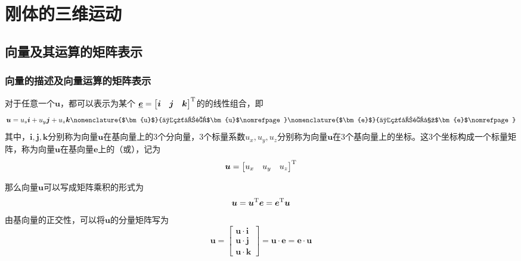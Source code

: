 \chapter{刚体的三维运动}
\thispagestyle{empty}
\section{向量及其运算的矩阵表示}
\label{向量运算的矩阵表示}

\subsection{向量的描述及向量运算的矩阵表示}
对于任意一个$\bm{u}$，都可以表示为某个
$\underline{\bm{e}} = \big[ \bm{i} \quad \bm{j} \quad \bm{k} \big]^{\text{T}} $的的线性组合，即
\begin{equation}
	\bm{u} = u_s \bm{i} + u_y \bm{j} + u_z \bm{k}
	\nomenclature{$\bm{u}$}{三维向量$\bm{u}$\nomrefpage}
	\nomenclature{$\bm{e}$}{三维向量基$\bm{e}$\nomrefpage}
\end{equation}
其中，$\bm{i}, \bm{j}, \bm{k}$分别称为向量$\bm{u}$在基向量上的3个分向量，3个标量系数$u_x,u_y,u_z$分别称为向量$\bm{u}$在3个基向量上的坐标。这3个坐标构成一个标量矩阵，称为向量$\bm{u}$在基向量$\bm{e}$上的（或），记为
\begin{equation}
	\bm{u} = \big[ u_x \quad u_y \quad u_z \big]^{\text{T}}	
\end{equation}

那么向量$\bm{u}$可以写成矩阵乘积的形式为
\begin{equation}
	\bm{u} = \bm{u}^{\text{T}} \bm{e} = \bm{e}^{\text{T}} \bm{u}
\end{equation}
由基向量的正交性，可以将$\bm{u}$的分量矩阵写为
\begin{equation}
	\bm{u} =
	\begin{bmatrix}
		\bm{u} \cdot \bm{i} \\
		\bm{u} \cdot \bm{j} \\
		\bm{u} \cdot \bm{k}
	\end{bmatrix}
	= \bm{u} \cdot \bm{e} = \bm{e} \cdot \bm{u}
\end{equation}


